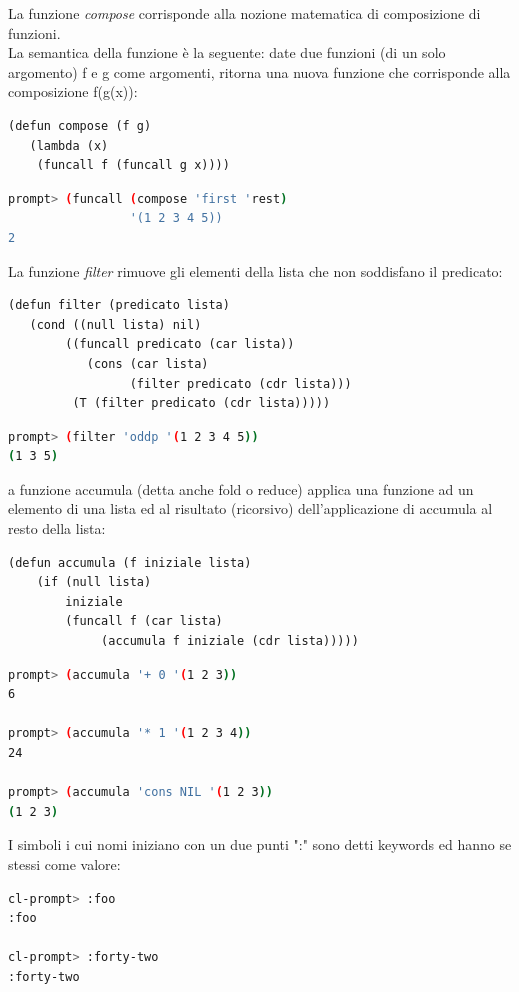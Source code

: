 \documentclass[a4paper,12pt, oneside]{book}
\begin{document}
La funzione \textit{compose} corrisponde alla nozione matematica di
composizione di funzioni. \\La semantica della funzione è la seguente: date due funzioni (di
un solo argomento) f e g come argomenti, ritorna una nuova
funzione che corrisponde alla composizione f(g(x)):
\begin{verbatim}
(defun compose (f g)
   (lambda (x)
    (funcall f (funcall g x))))
\end{verbatim}
\begin{shaded}
\begin{lstlisting}[language=bash]
prompt> (funcall (compose 'first 'rest)
                 '(1 2 3 4 5))
2
\end{lstlisting}
\end{shaded}
La funzione \textit{filter} rimuove gli elementi della lista che non soddisfano il predicato:
\begin{verbatim}
(defun filter (predicato lista)
   (cond ((null lista) nil)
        ((funcall predicato (car lista))
           (cons (car lista)
                 (filter predicato (cdr lista)))
         (T (filter predicato (cdr lista)))))
\end{verbatim}
\begin{shaded}
\begin{lstlisting}[language=bash]
prompt> (filter 'oddp '(1 2 3 4 5))
(1 3 5)
\end{lstlisting}
\end{shaded}
a funzione accumula (detta anche fold o reduce) applica una funzione ad
un elemento di una lista ed al risultato (ricorsivo) dell'applicazione di accumula
al resto della lista:
\begin{verbatim}
(defun accumula (f iniziale lista)
    (if (null lista)
        iniziale
        (funcall f (car lista)
             (accumula f iniziale (cdr lista)))))
\end{verbatim}
\begin{shaded}
\begin{lstlisting}[language=bash]
prompt> (accumula '+ 0 '(1 2 3))
6

prompt> (accumula '* 1 '(1 2 3 4))
24

prompt> (accumula 'cons NIL '(1 2 3))
(1 2 3)
\end{lstlisting}
\end{shaded}
I simboli i cui nomi iniziano con un due punti ":" sono detti
keywords ed hanno se stessi come valore:
\begin{shaded}
\begin{lstlisting}[language=bash]
cl-prompt> :foo
:foo
 
cl-prompt> :forty-two
:forty-two
\end{lstlisting}
\end{shaded}
\end{document}
